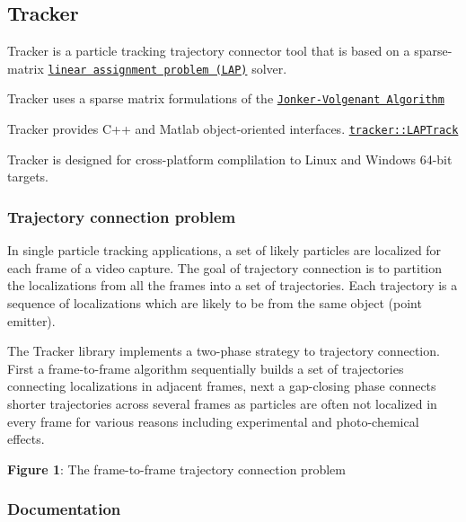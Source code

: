 \href{https://travis-ci.org/markjolah/Tracker}{\tt } \subsection*{Tracker}

Tracker is a particle tracking trajectory connector tool that is based on a sparse-\/matrix \href{https://en.wikipedia.org/wiki/Assignment_problem}{\tt linear assignment problem (L\+AP)} solver.
\begin{DoxyItemize}
\item Tracker uses a sparse matrix formulations of the \href{https://dl.acm.org/citation.cfm?id=30107}{\tt Jonker-\/\+Volgenant Algorithm}
\item Tracker provides C++ and Matlab object-\/oriented interfaces. \href{http://markolah.pecos.us/Tracker/classtracker_1_1LAPTrack.html}{\tt {\ttfamily tracker\+::\+L\+A\+P\+Track}}
\item Tracker is designed for cross-\/platform complilation to Linux and Windows 64-\/bit targets.
\end{DoxyItemize}

\subsubsection*{Trajectory connection problem}

In single particle tracking applications, a set of likely particles are localized for each frame of a video capture. The goal of trajectory connection is to partition the localizations from all the frames into a set of trajectories. Each trajectory is a sequence of localizations which are likely to be from the same object (point emitter).

The Tracker library implements a two-\/phase strategy to trajectory connection. First a frame-\/to-\/frame algorithm sequentially builds a set of trajectories connecting localizations in adjacent frames, next a gap-\/closing phase connects shorter trajectories across several frames as particles are often not localized in every frame for various reasons including experimental and photo-\/chemical effects.

\href{https://raw.githubusercontent.com/markjolah/Tracker/master/doc/images/tracker_problem.png}{\tt } 

{\bfseries Figure 1}\+: The frame-\/to-\/frame trajectory connection problem 

\subsubsection*{Documentation}

